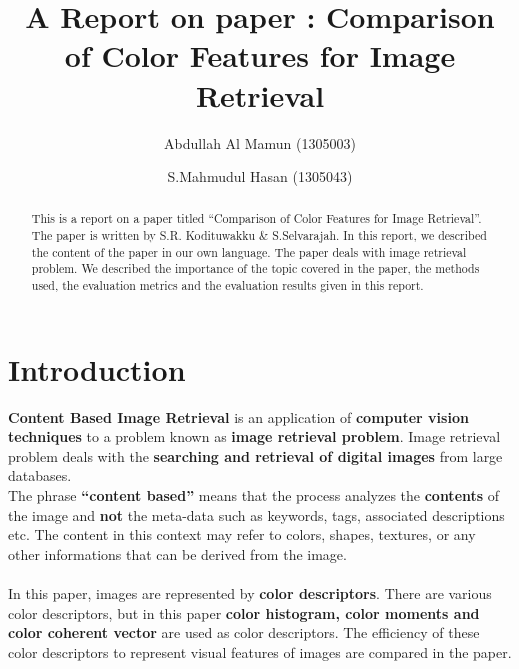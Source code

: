 \documentclass[pstricks,10pt,notitlepage]{report}
\title{A Report on paper : Comparison of Color Features for Image Retrieval}
\author{
  Abdullah Al Mamun (1305003)
  \and
  S.Mahmudul Hasan (1305043)
  }
\date{}
\begin{document}
\maketitle

\begin{abstract}
This is a report on a paper titled ``Comparison of Color Features for Image Retrieval''. The paper is written by S.R. Kodituwakku \& S.Selvarajah. In this report, we described the content of the paper in our own language. The paper deals with image retrieval problem. We described the importance of the topic covered in the paper, the methods used, the evaluation metrics and the evaluation results given in this report.
\end{abstract}


\section{Introduction}

\textbf{Content Based Image Retrieval}  is an application of \textbf{computer vision 
techniques} to a problem known as \textbf{image retrieval problem}. Image retrieval 
problem deals with the \textbf{searching and retrieval of digital images} from 
large databases.\\
\newline
The phrase \textbf{“content based”} means that the process analyzes the \textbf{contents} 
of the image and \textbf{not} the meta-data such as keywords, tags, associated 
descriptions etc. The content in this context may refer to colors, 
shapes, textures, or any other informations that can be derived from the image.\\
\\
In this paper, images are represented by \textbf{color descriptors}. There are various color descriptors, but in this paper \textbf{color histogram, color moments and color coherent vector} are used as color descriptors. The efficiency of these color descriptors to represent visual features of images are compared in the paper. 
\end{document}
